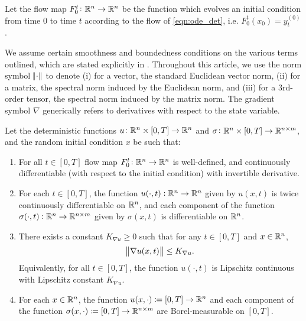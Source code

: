 Let the flow map \(F_{0}^{t}\colon \mathbb{R}^n \to \mathbb{R}^n\) be the function which evolves an initial condition from time \(0\) to time \(t\) according to the flow of \cref{eqn:ode_det}, i.e. \(F_0^t\!\left(x_0\right) = y_t^{(0)}\).

We assume certain smoothness and boundedness conditions on the various terms outlined, which are stated explicitly in .
Throughout this article, we use the norm symbol \(\norm{\cdot}\) to denote (i) for a vector, the standard Euclidean vector norm, (ii) for a matrix, the spectral norm induced by the Euclidean norm, and (iii) for a 3rd-order tensor, the spectral norm induced by the matrix norm.
The gradient symbol \(\nabla\) generically refers to derivatives with respect to the state variable.

\renewcommand\thehypo{H}
\begin{hypo}\label{hyp:smooth}
	Let the deterministic functions \(u \colon \mathbb{R}^n\times [0,T] \to \mathbb{R}^n\) and \(\sigma \colon \mathbb{R}^n \times [0,T] \to \mathbb{R}^{n\times m}\), and the random initial condition \(x\) be such that:
	\begin{enumerate}[label=(H.\arabic{*}), ref=H.\arabic{*}]
		\item\label{hyp:fm_exists} For all \(t \in [0,T]\) flow map \(F_0^t \colon \mathbb{R}^n \to \mathbb{R}^n\) is well-defined, and continuously differentiable (with respect to the initial condition) with invertible derivative.

		\item\label{hyp:coef_cont} For each \(t \in [0,T]\), the function \(u(\cdot, t): \mathbb{R}^n \to \mathbb{R}^n\) given by \(u(x,t)\) is twice continuously differentiable on \(\mathbb{R}^n\), and each component of the function \(\sigma(\cdot, t): \mathbb{R}^n \to \mathbb{R}^{n\times m}\) given by \(\sigma(x,t)\) is differentiable on \(\mathbb{R}^n\).

		\item\label{hyp:u_bounds} There exists a constant \(K_{\nabla u} \geq 0\) such that for any \(t \in [0,T]\) and \(x \in \mathbb{R}^n\),
		\begin{equation*}
			\norm{\nabla u(x,t)} \leq K_{\nabla u}.
		\end{equation*}
		Equivalently, for all \(t \in [0,T]\), the function \(u\!\left(\cdot, t\right)\) is Lipschitz continuous with Lipschitz constant \(K_{\nabla u}\).

		\item\label{hyp:coef_meas} For each \(x \in \mathbb{R}^n\), the function \(u(x,\cdot) \coloneqq [0,T] \to \mathbb{R}^n\) and each component of the function \(\sigma(x,\cdot) \coloneqq [0,T] \to \mathbb{R}^{n\times m}\) are Borel-measurable on \([0,T]\).


\end{enumerate}
\end{hypo}
